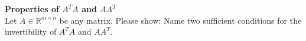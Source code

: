\textbf{Properties of $A^TA$ and $AA^T$}\\
Let $A \in  \mathbb{R}^{m \times n}$ be any matrix. Please show: Name two sufficient conditions for the invertibility of $A^TA$ and $AA^T$.
